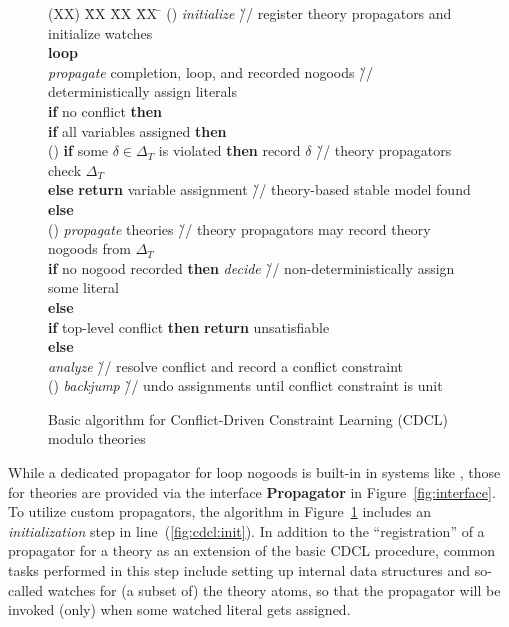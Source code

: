 \begin{figure}[t]
  \setcounter{cddl}{8}
  \renewcommand{\thecddl}{\Alph{cddl}}
  \begin{tabbing}
   (XX)  \= XX \= XX \= XX \= \kill%
   (\thecddl)\label{fig:cdcl:init}
         \> \textit{initialize} \` // register theory propagators and initialize watches \\
         \> \textbf{loop} \\
         \> \> \textit{propagate} completion, loop, and recorded nogoods
               \` // deterministically assign literals \\
         \> \> \textbf{if} no conflict \textbf{then} \\
         \> \> \> \textbf{if} all variables assigned \textbf{then} \\
   \setcounter{cddl}{2}%
   (\thecddl)\label{fig:cdcl:check}
         \> \> \> \> \textbf{if} some $\delta\in\Delta_T$ is violated \textbf{then} record $\delta$
                     \` // theory propagators check $\Delta_T$ \\
         \> \> \> \> \textbf{else} \textbf{return} variable assignment
                   \`// theory-based stable model found \\
         \> \> \> \textbf{else} \\
   \setcounter{cddl}{15}%
   (\thecddl)\label{fig:cdcl:propagate}
         \> \> \> \> \textit{propagate} theories
                     \`// theory propagators may record theory nogoods from $\Delta_T$ \\
         \> \> \> \> \textbf{if} no nogood recorded \textbf{then} \textit{decide}
                     \`// non-deterministically assign some literal \\
         \> \> \textbf{else} \\
         \> \> \> \textbf{if} top-level conflict \textbf{then} \textbf{return} unsatisfiable \\
         \> \> \> \textbf{else} \\
         \> \> \> \> \textit{analyze} \`// resolve conflict and record a conflict constraint \\
   \setcounter{cddl}{20}%
   (\thecddl)\label{fig:cdcl:undo}
         \> \> \> \> \textit{backjump} \`// undo assignments until conflict constraint is unit
 \end{tabbing}
\caption{Basic algorithm for Conflict-Driven Constraint Learning (CDCL) modulo theories}
\label{fig:cdcl}
\end{figure}%
%
While a dedicated propagator for loop nogoods is built-in in systems like \clingo,
those for theories are provided via the interface \textbf{Propagator} in Figure~\ref{fig:interface}.
To utilize custom propagators,
the algorithm in Figure~\ref{fig:cdcl} includes an \emph{initialization} step in line~(\ref{fig:cdcl:init}).
In addition to the ``registration'' of a propagator for a theory
as an extension of the basic CDCL procedure,
common   tasks performed in this step include setting up internal data structures and
so-called watches for (a subset of) the theory atoms,
so that the propagator will be invoked (only) when some watched literal gets assigned.

